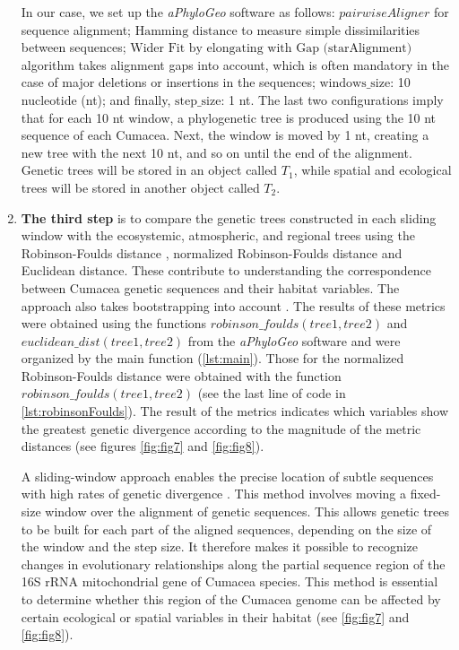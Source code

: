 \begin{enumerate}
In our case, we set up the \textit{aPhyloGeo} software as follows: $pairwiseAligner$ for sequence alignment; $\text{Hamming distance}$ to measure simple dissimilarities between sequences; $\text{Wider Fit by elongating with Gap (starAlignment)}$ algorithm takes alignment gaps into account, which is often mandatory in the case of major deletions or insertions in the sequences; $\text{windows\_size}$: 10 nucleotide (nt); and finally, $\text{step\_size}$: 1 nt. The last two configurations imply that for each 10 nt window, a phylogenetic tree is produced using the 10 nt sequence of each Cumacea. Next, the window is moved by 1 nt, creating a new tree with the next 10 nt, and so on until the end of the alignment. Genetic trees will be stored in an object called $T_1$, while spatial and ecological trees will be stored in another object called $T_2$.

\item \textbf{The third step} is to compare the genetic trees constructed in each sliding window with the ecosystemic, atmospheric, and regional trees using the Robinson-Foulds distance \citep{robinson_comparison_1981}, normalized Robinson-Foulds distance and Euclidean distance. These contribute to understanding the correspondence between Cumacea genetic sequences and their habitat variables. The approach also takes bootstrapping into account \citep{koshkarov_phylogeography_2022, li2023aphylogeo, li2024host}. The results of these metrics were obtained using the functions $robinson\_foulds(tree1, tree2)$ and $euclidean\_dist(tree1, tree2)$ from the \textit{aPhyloGeo} software and were organized by the main function (\autoref{lst:main}). Those for the normalized Robinson-Foulds distance were obtained with the function $robinson\_foulds(tree1, tree2)$ (see the last line of code in \autoref{lst:robinsonFoulds}). The result of the metrics indicates which variables show the greatest genetic divergence according to the magnitude of the metric distances (see figures \ref{fig:fig7} and \ref{fig:fig8}).

A sliding-window approach enables the precise location of subtle sequences with high rates of genetic divergence \citep{koshkarov_phylogeography_2022, li2023aphylogeo, li2024host}. This method involves moving a fixed-size window over the alignment of genetic sequences. This allows genetic trees to be built for each part of the aligned sequences, depending on the size of the window and the step size. It therefore makes it possible to recognize changes in evolutionary relationships along the partial sequence region of the 16S rRNA mitochondrial gene of Cumacea species. This method is essential to determine whether this region of the Cumacea genome can be affected by certain ecological or spatial variables in their habitat (see \autoref{fig:fig7} and \autoref{fig:fig8}).
\end{enumerate}

